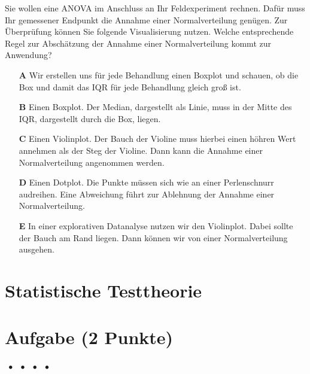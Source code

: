 \documentclass[a4paper, 9pt]{scrartcl}\usepackage[]{graphicx}\usepackage[]{xcolor}
\begin{document}
Sie wollen eine ANOVA im Anschluss an Ihr Feldexperiment rechnen. Dafür muss Ihr gemessener Endpunkt die Annahme einer Normalverteilung genügen. Zur Überprüfung können Sie folgende Visualisierung nutzen. Welche entsprechende Regel zur Abschätzung der Annahme einer Normalverteilung kommt zur Anwendung?



\begin{enumerate}
\item [\textbf{A} \msquare] Wir erstellen uns für jede Behandlung einen Boxplot und schauen, ob die Box und damit das IQR für jede Behandlung gleich groß ist.
\item [\textbf{B} \msquare] Einen Boxplot. Der Median, dargestellt als Linie, muss in der Mitte des IQR, dargestellt durch die Box, liegen.
\item [\textbf{C} \msquare] Einen Violinplot. Der Bauch der Violine muss hierbei einen höhren Wert annehmen als der Steg der Violine. Dann kann die Annahme einer Normalverteilung angenommen werden.
\item [\textbf{D} \msquare] Einen Dotplot. Die Punkte müssen sich wie an einer Perlenschnurr audreihen. Eine Abweichung führt zur Ablehnung der Annahme einer Normalverteilung.
\item [\textbf{E} \msquare] In einer explorativen Datanalyse nutzen wir den Violinplot. Dabei sollte der Bauch am Rand liegen. Dann können wir von einer Normalverteilung ausgehen.
\end{enumerate}
\section*{Statistische Testtheorie}  

\section{Aufgabe \hfill (2 Punkte)}

\ifcollection
\begin{flushright}
\tiny\vspace{-2Ex}
\textbf{\examinhaltstart}
\exammodulemathstat $\;\bullet$
\exammodulestat $\;\bullet$
\exammodulestatbbv $\;\bullet$
\exammodulestatversuch $\;\bullet$
\exammodulebiostat
\vspace{-1Ex}
\end{flushright}
\fi
\end{document}
